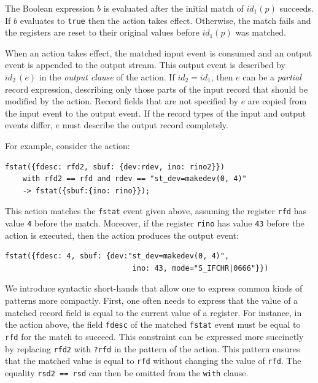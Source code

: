 The Boolean expression $b$ is evaluated after the initial match of $\mathit{id}_1(p)$ succeeds. If $b$ evaluates to \lstinline+true+ then the action takes effect. Otherwise, the match fails and the registers are reset to their original values before $\mathit{id}_1(p)$ was matched.

When an action takes effect, the matched input event is consumed and an output event is appended to the output stream. This output event is described by $\mathit{id}_2\,(e)$ in the \emph{output clause} of the action. If $\mathit{id}_2=\mathit{id}_1$, then $e$ can be a \emph{partial} record expression, describing only those parts of the input record that should be modified by the action. Record fields that are not specified by $e$ are copied from the input event to the output event. If the record types of the input and output events differ, $e$ must describe the output record completely.

For example, consider the action:
\begin{lstlisting}[numbers=none,xleftmargin=0em,gobble=2]
  fstat({fdesc: rfd2, sbuf: {dev:rdev, ino: rino2}})
    with rfd2 == rfd and rdev == "st_dev=makedev(0, 4)"
    -> fstat({sbuf:{ino: rino}});
\end{lstlisting}
This action matches the \lstinline+fstat+ event given above, assuming the register \lstinline+rfd+ has value \lstinline+4+ before the match. Moreover, if the register \lstinline+rino+ has value \lstinline+43+ before the action is executed, then the action produces the output event:
\begin{lstlisting}[numbers=none,xleftmargin=0em,gobble=2]
  fstat({fdesc: 4, sbuf: {dev:"st_dev=makedev(0, 4)",
                             ino: 43, mode="S_IFCHR|0666"}})
\end{lstlisting}

We introduce syntactic short-hands that allow one to express common kinds of patterns more compactly. First, one often needs to express that the value of a matched record field is equal to the current value of a register. For instance, in the action above, the field \lstinline+fdesc+ of the matched \lstinline+fstat+ event must be equal to \lstinline+rfd+ for the match to succeed. This constraint can be expressed more succinctly by replacing \lstinline+rfd2+ with \lstinline+?rfd+ in the pattern of the action. This pattern ensures that the matched value is equal to \lstinline+rfd+ without changing the value of \lstinline+rfd+. The equality \lstinline+rsd2 == rsd+ can then be omitted from the \lstinline+with+ clause.

